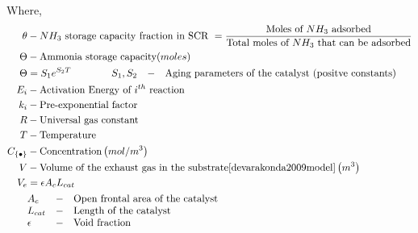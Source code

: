 Where,
\begin{align*}
    \theta &- NH_3 \text{ storage capacity fraction in SCR } = \frac{\text{Moles of $NH_3$ adsorbed}}{\text{Total moles of $NH_3$ that can be adsorbed}}\\
    \Theta &- \text{Ammonia storage capacity} (moles)\\
    \Theta &= S_1 e^{S_2 T} \qquad \qquad \begin{matrix*}[l]
                S_1, S_2 &-& \text{Aging parameters of the catalyst (positve constants)}
            \end{matrix*}\\
    E_i &- \text{Activation Energy of $i^{th}$ reaction}\\
    k_i &- \text{Pre-exponential factor}\\
    R &- \text{Universal gas constant}\\
    T &- \text{Temperature}\\
    C_{\{\bullet\}} &- \text{Concentration} \lr{mol/m^3}\\
    V &- \text{Volume of the exhaust gas in the substrate\cite{devarakonda2009model}} \lr{m^3}\\
    V_e &= \epsilon A_c L_{cat}\\
        &\begin{matrix*}[l]
        A_c &-& \text{Open frontal area of the catalyst}\\
        L_{cat} &-& \text{Length of the catalyst}\\
        \epsilon &-& \text{Void fraction}
        \end{matrix*}\\
\end{align*}

